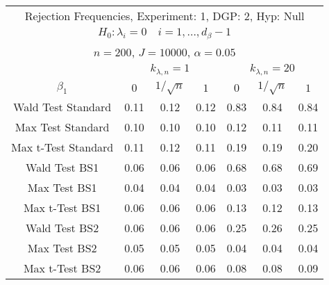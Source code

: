  \begin{table}[H] 
 \singlespacing 
 \small 
 \centering 
\begin{tabular}{c|ccc|ccc} 
\multicolumn{7}{c}{ Rejection Frequencies, Experiment: 1, DGP: 2, Hyp: Null } \\ 
\multicolumn{7}{c}{ $H_0: \lambda_{i} = 0 \quad i = 1,\dots,d_{\beta}-1$} \\
\multicolumn{7}{c}{ $n=200$, $J=10000$, $\alpha = 0.05$ } \\ 
 \multicolumn{1}{c}{} & \multicolumn{3}{c}{ $k_{\lambda,n}=1$ } & \multicolumn{3}{c}{ $k_{\lambda,n}=20$ } \\ 
 \hline 
 $\beta_{1}$ & $0$ & $1/\sqrt{n}$  & $1$ & $0$ & $1/\sqrt{n}$  & $1$   \\ 
 \hline 
 \hline 
 Wald Test Standard &  0.11 &  0.12  &  0.12 &  0.83 &  0.84  &  0.84 \\ 
 Max Test Standard &  0.10 &  0.10  &  0.10 &  0.12 &  0.11  &  0.11 \\ 
 Max t-Test Standard &  0.11 &  0.12  &  0.11 &  0.19 &  0.19  &  0.20 \\ 
 \hline 
 Wald Test BS1 &  0.06 &  0.06  &  0.06 &  0.68 &  0.68  &  0.69 \\ 
 Max Test BS1 &  0.04 &  0.04  &  0.04 &  0.03 &  0.03  &  0.03 \\ 
 Max t-Test BS1 &  0.06 &  0.06  &  0.06 &  0.13 &  0.12  &  0.13 \\ 
 \hline 
 Wald Test BS2 &  0.06 &  0.06  &  0.06 &  0.25 &  0.26  &  0.25 \\ 
 Max Test BS2 &  0.05 &  0.05  &  0.05 &  0.04 &  0.04  &  0.04 \\ 
 Max t-Test BS2 &  0.06 &  0.06  &  0.06 &  0.08 &  0.08  &  0.09 \\ 
 \hline 
\end{tabular}
 \end{table}
